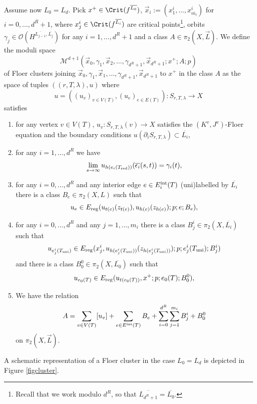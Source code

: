 Assume now $L_0=L_d$. Pick $x^+\in \Crit(f^{\overline{L_0}})$, $\vec{x}_i:=(x_1^i,\ldots,x_{\overline{m_i}}^i)$ for $i=0,\ldots,d^R+1$, where $x^i_j\in \Crit(f^{\overline{L_i}})$ are critical points\footnote{Recall that we work modulo $d^R$, so that $\overline{L_{d^R+1}}=\overline{L_0}$.}, orbits $\gamma_j\in \mathcal{O}(H^{\overline{L_{j-1}},\overline{L_j}})$ for any $i=1,\ldots,d^R+1$ and a class $A\in \pi_2(X,\vec{L})$. We define the moduli space $$\mathcal{M}^{d+1}\left(\vec{x}_0, \gamma_1, \vec{x}_2,\ldots,\gamma_{d^R+1}, \vec{x}_{d^R+1}; x^+;A;p\right)$$ of Floer clusters joining $\vec{x}_0, \gamma_1, \vec{x}_1,\ldots,\gamma_{d^R+1}, \vec{x}_{d^R+1}$ to $x^+$ in the class $A$ as the space of tuples $((r,T,\lambda),u)$ where $$u=((u_v)_{v\in V(T)}, (u_e)_{e\in E(T)}): S_{r,T,\lambda}\to X$$ satisfies\begin{enumerate}
	\item for any vertex $v\in V(T)$, $u_v:S_{r,T,\lambda}(v)\to X$ satisfies the $(K^v,J^v)$-Floer equation and the boundary conditions $u(\partial_iS_{r,T,\lambda})\subset \overline{L_i}$,
	\item for any $i=1,\ldots,d^R$ we have $$\lim_{s\to \-\infty}u_{h(e_i(T_\textnormal{red}))}(\overline{\epsilon_i}(s,t))=\gamma_i(t),$$
	\item for any $i=0,\ldots,d^R$ and any interior edge $e\in E_i^\textnormal{int}(T)$ (uni)labelled by $\overline{L_i}$ there is a class $B_e\in \pi_2(X,L)$ such that $$u_e\in E_\textnormal{reg}(u_{t(e)}(z_{t(e)}), u_{h(e)}(z_{h(e)});p;e;B_e),$$
	\item for any $i=0,\ldots,d^R$ and any $j=1,\ldots,m_i$ there is a class $B_j^i\in \pi_2(X,\overline{L_i})$ such that $$u_{e^i_j(T_\textnormal{uni})}\in E_\textnormal{reg}(x^i_{j}, u_{h(e^i_j(T_\textnormal{uni}))}(z_{h(e^i_j(T_\textnormal{uni}))});p;e^i_j(T_\textnormal{uni});B_j^i)$$ and there is a class $B_0^0\in \pi_2(X,\overline{L_0})$ such that $$u_{e_0(T)}\in E_\textnormal{reg}(u_{t(e_0(T))}, x^+;p;e_0(T);B_0^0),$$
	\item We have the relation $$A=\sum_{v\in V(T)}[u_v]+\sum_{e\in E^\textnormal{int}(T)}B_e+\sum_{i=0}^{d^R}\sum_{j=1}^{m_i}B_j^i+B_0^0$$ on $\pi_2(X,\vec{L})$.
\end{enumerate}
\noindent A schematic representation of a Floer cluster in the case $L_0=L_d$ is depicted in Figure \ref{figcluster}.

